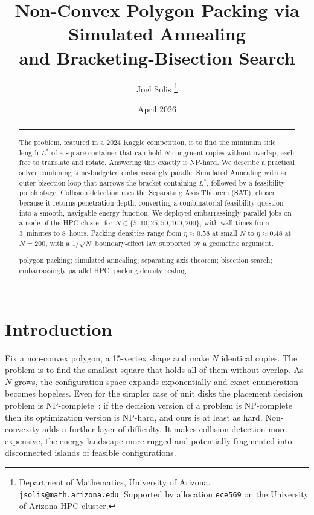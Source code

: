 \documentclass[10pt,twocolumn]{article}
\title{%
  \Large\bfseries
  Non-Convex Polygon Packing via Simulated Annealing\\[4pt]
  and Bracketing-Bisection Search%
}
\author{%
  Joel Solis%
  \thanks{Department of Mathematics, University of Arizona.
    \texttt{jsolis@math.arizona.edu}.
    Supported by allocation \texttt{ece569} on the
    University of Arizona HPC cluster.}%
}
\date{April 2026}
\begin{document}
\maketitle
\thispagestyle{firstpage}

\begin{abstract}
\vspace{-2pt}
\noindent\rule{\linewidth}{0.4pt}\vspace{4pt}

\enspace\small
The problem, featured in a 2024
Kaggle competition, is to find the minimum side length $L^*$ of a
square container that can hold $N$ congruent copies without overlap,
each free to translate and rotate. Answering this exactly is NP-hard.
We describe a practical solver combining time-budgeted embarrassingly parallel
 Simulated
Annealing with an outer bisection loop that narrows the bracket
containing $L^*$, followed by a
feasibility-polish stage. Collision detection uses the Separating Axis
Theorem (SAT), chosen because it returns penetration depth, converting
a combinatorial feasibility question into a smooth, navigable energy
function. We deployed embarrassingly parallel jobs on a node of the
HPC cluster for $N \in \{5, 10, 25, 50, 100, 200\}$, with wall times
from 3~minutes to 8~hours. Packing densities range from
$\eta \approx 0.58$ at small $N$ to $\eta \approx 0.48$ at $N = 200$,
with a $1/\!\sqrt{N}$ boundary-effect law supported by a geometric
argument.

\vspace{5pt}
\enspace\small
polygon packing; simulated annealing; separating axis theorem;
bisection search; embarrassingly parallel HPC; packing density scaling.

\vspace{4pt}
\noindent\rule{\linewidth}{0.4pt}\vspace{2pt}
\end{abstract}

\section{Introduction}
\label{sec:intro}

Fix a non-convex polygon, a 15-vertex shape and make $N$ identical copies.
The problem is to find the smallest square that holds all of them
without overlap. As $N$ grows, the configuration space expands
exponentially and exact enumeration becomes hopeless. Even for the
simpler case of unit disks the placement decision problem is
NP-complete~\cite{demaine2007}: if the decision version of a problem
is NP-complete then its optimization version is NP-hard, and ours is
at least as hard. Non-convexity adds a further layer of difficulty.
It makes collision detection more expensive, the energy landscape more
rugged and potentially fragmented into disconnected islands of 
feasible configurations.
\end{document}
